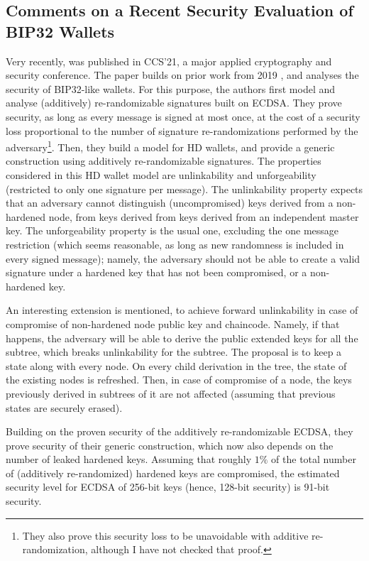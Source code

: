 \subsection{Comments on a Recent Security Evaluation of BIP32 Wallets}

Very recently, \cite{def+21} was published in CCS'21, a major applied
cryptography and security conference. The paper builds on prior work from
2019 \cite{dfl19}, and analyses the security of BIP32-like wallets. For this purpose,
the authors first model and analyse (additively) re-randomizable signatures
built on ECDSA. They prove security, as long as every message is signed at
most once, at the cost of a security loss proportional to the number of
signature re-randomizations performed by the adversary\footnote{They also prove
  this security loss to be unavoidable with additive re-randomization, although
  I have not checked that proof.}. Then, they build a model for HD wallets,
and provide a generic construction using additively re-randomizable signatures.
The properties considered in this HD wallet model are unlinkability and
unforgeability (restricted to only one signature per message). The unlinkability
property expects that an adversary cannot distinguish (uncompromised) keys
derived from a non-hardened node, from keys derived from keys derived from an
independent master key. The unforgeability property is the usual one, excluding
the one message restriction (which seems reasonable, as long as new randomness
is included in every signed message); namely, the adversary should not be able
to create a valid signature under a hardened key that has not been compromised,
or a non-hardened key.

An interesting extension is mentioned, to achieve forward unlinkability in case
of compromise of non-hardened node public key and chaincode. Namely, if that
happens, the adversary will be able to derive the public extended keys for
all the subtree, which breaks unlinkability for the subtree. The proposal is to
keep a state along with every node. On every child derivation in the tree, the
state of the existing nodes is refreshed. Then, in case of compromise of a
node, the keys previously derived in subtrees of it are not affected (assuming
that previous states are securely erased).

Building on the proven security of the additively re-randomizable ECDSA, they
prove security of their generic construction, which now also depends on the
number of leaked hardened keys. Assuming that roughly $1\%$ of the total number
of (additively re-randomized) hardened keys are compromised, the estimated
security level for ECDSA of 256-bit keys (hence, 128-bit security) is 91-bit
security.

